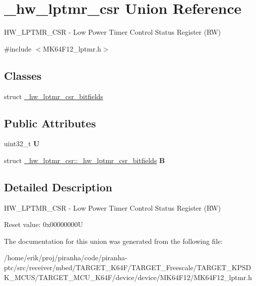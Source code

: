 \hypertarget{union__hw__lptmr__csr}{}\section{\+\_\+hw\+\_\+lptmr\+\_\+csr Union Reference}
\label{union__hw__lptmr__csr}


H\+W\+\_\+\+L\+P\+T\+M\+R\+\_\+\+C\+SR -\/ Low Power Timer Control Status Register (RW)  




{\ttfamily \#include $<$M\+K64\+F12\+\_\+lptmr.\+h$>$}

\subsection*{Classes}
\begin{DoxyCompactItemize}
\item 
struct \hyperlink{struct__hw__lptmr__csr_1_1__hw__lptmr__csr__bitfields}{\+\_\+hw\+\_\+lptmr\+\_\+csr\+\_\+bitfields}
\end{DoxyCompactItemize}
\subsection*{Public Attributes}
\begin{DoxyCompactItemize}
\item 
uint32\+\_\+t {\bfseries U}\hypertarget{union__hw__lptmr__csr_a8b215b61a9996a632e47a6f43b770566}{}\label{union__hw__lptmr__csr_a8b215b61a9996a632e47a6f43b770566}

\item 
struct \hyperlink{struct__hw__lptmr__csr_1_1__hw__lptmr__csr__bitfields}{\+\_\+hw\+\_\+lptmr\+\_\+csr\+::\+\_\+hw\+\_\+lptmr\+\_\+csr\+\_\+bitfields} {\bfseries B}\hypertarget{union__hw__lptmr__csr_a2c3b0bdcab59b1b942ae9e184d92176c}{}\label{union__hw__lptmr__csr_a2c3b0bdcab59b1b942ae9e184d92176c}

\end{DoxyCompactItemize}


\subsection{Detailed Description}
H\+W\+\_\+\+L\+P\+T\+M\+R\+\_\+\+C\+SR -\/ Low Power Timer Control Status Register (RW) 

Reset value\+: 0x00000000U 

The documentation for this union was generated from the following file\+:\begin{DoxyCompactItemize}
\item 
/home/erik/proj/piranha/code/piranha-\/ptc/src/receiver/mbed/\+T\+A\+R\+G\+E\+T\+\_\+\+K64\+F/\+T\+A\+R\+G\+E\+T\+\_\+\+Freescale/\+T\+A\+R\+G\+E\+T\+\_\+\+K\+P\+S\+D\+K\+\_\+\+M\+C\+U\+S/\+T\+A\+R\+G\+E\+T\+\_\+\+M\+C\+U\+\_\+\+K64\+F/device/device/\+M\+K64\+F12/M\+K64\+F12\+\_\+lptmr.\+h\end{DoxyCompactItemize}
